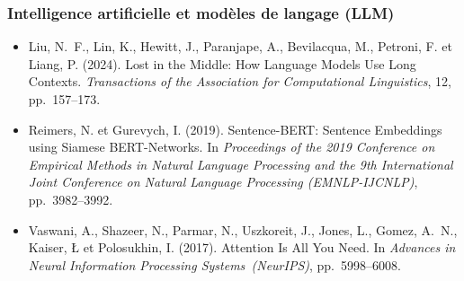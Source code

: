 \documentclass[12pt,a4paper]{report}
\begin{document}
\subsubsection*{Intelligence artificielle et modèles de langage (LLM)}
\begin{itemize}[leftmargin=1.5em, itemsep=0.6em, label={}]
  \item\label{ref:liu2024} Liu, N.~F., Lin, K., Hewitt, J., Paranjape, A., Bevilacqua, M., Petroni, F. et Liang, P. (2024). Lost in the Middle: How Language Models Use Long Contexts. \textit{Transactions of the Association for Computational Linguistics}, 12, pp.~157--173.

  \item\label{ref:reimers2019} Reimers, N. et Gurevych, I. (2019). Sentence-BERT: Sentence Embeddings using Siamese BERT-Networks. In \textit{Proceedings of the 2019 Conference on Empirical Methods in Natural Language Processing and the 9th International Joint Conference on Natural Language Processing (EMNLP-IJCNLP)}, pp.~3982--3992.

  \item\label{ref:vaswani2017} Vaswani, A., Shazeer, N., Parmar, N., Uszkoreit, J., Jones, L., Gomez, A.~N., Kaiser, \L{} et Polosukhin, I. (2017). Attention Is All You Need. In \textit{Advances in Neural Information Processing Systems~(NeurIPS)}, pp.~5998--6008.
\end{itemize}
\end{document}
